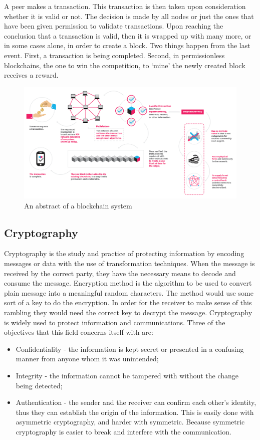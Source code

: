 \documentclass[a4paper,11pt]{report}
\begin{document}
A peer makes a transaction. This transaction is then taken upon consideration whether it is valid or not. The decision is made by all nodes or just the ones that have been given permission to validate transactions. Upon reaching the conclusion that a transaction is valid,  then it is wrapped up with many more, or in some cases alone, in order to create a block. Two things happen from the last event. First, a transaction is being completed. Second, in permissionless blockchains, the one to win the competition, to ‘mine’ the newly created block receives a reward. 

\begin{figure}[h]
\centering
  \includegraphics[width=16cm]{infographics0517-01-1.png}
  \caption{An abstract of a blockchain system \cite{whatIsBlockgeeks}}
  \label{blockchainAbstract}
\end{figure}

\subsection{Cryptography}
Cryptography is the study and practice of protecting information by encoding messages or data with the use of transformation techniques. When the message is received by the correct party, they have the necessary means to decode and consume the message. 
	Encryption method is the algorithm to be used to convert plain message into a meaningful random characters. The method would use some sort of a key to do the encryption. In order for the receiver to make sense of this rambling they would need the correct key to decrypt the message.\cite{cryptolecture} Cryptography is widely used to protect information and communications. Three of the objectives that this field concerns itself with are: 
\begin{itemize}

\item Confidentiality - the information is kept secret or presented in a confusing manner from anyone whom it was unintended; 
\item Integrity - the information cannot be tampered with without the change being detected;
\item Authentication - the sender and the receiver can confirm each other’s identity, thus they can establish the origin of the information. This is easily done with asymmetric cryptography, and harder with symmetric. Because symmetric cryptography is easier to break and interfere with the communication. 
\end{itemize}
\end{document}

